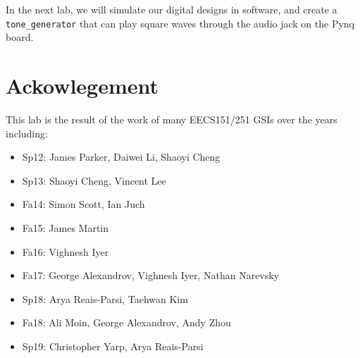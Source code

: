 \documentclass[11pt]{article}
\begin{document}
In the next lab, we will simulate our digital designs in software, and create a \verb|tone_generator| that can play square waves through the audio jack on the Pynq board.

\section*{Ackowlegement}
This lab is the result of the work of many EECS151/251 GSIs over the years including:
\begin{itemize}
\item Sp12: James Parker, Daiwei Li, Shaoyi Cheng
\item Sp13: Shaoyi Cheng, Vincent Lee
\item Fa14: Simon Scott, Ian Juch
\item Fa15: James Martin
\item Fa16: Vighnesh Iyer
\item Fa17: George Alexandrov, Vighnesh Iyer, Nathan Narevsky
\item Sp18: Arya Reais-Parsi, Taehwan Kim
\item Fa18: Ali Moin, George Alexandrov, Andy Zhou
\item Sp19: Christopher Yarp, Arya Reais-Parsi
\end{itemize}
\end{document}
